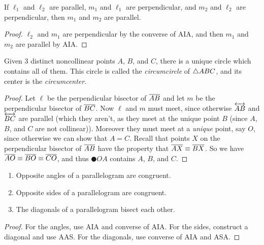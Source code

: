\begin{prop}
If \(\ell_1\) and \(\ell_2\) are parallel, \(m_1\) and \(\ell_1\) are perpendicular, and \(m_2\) and \(\ell_2\) are perpendicular, then \(m_1\) and \(m_2\) are parallel.
\end{prop}

\begin{proof}
\(\ell_2\) and \(m_1\) are perpendicular by the converse of AIA, and then \(m_1\) and \(m_2\) are parallel by AIA.
\end{proof}

\begin{construct}
Given 3 distinct noncollinear points \(A\), \(B\), and \(C\), there is a unique circle which contains all of them.
This circle is called the \emph{circumcircle} of \(\bigtriangleup{ABC}\), and its center is the \emph{circumcenter}.
\end{construct}

\begin{proof}
Let \(\ell\) be the perpendicular bisector of \(\overline{AB}\) and let \(m\) be the perpendicular bisector of \(\overline{BC}\).
Now \(\ell\) and \(m\) must meet, since otherwise \(\overleftrightarrow{AB}\) and \(\overleftrightarrow{BC}\) are parallel (which they aren't, as they meet at the unique point \(B\) (since \(A\), \(B\), and \(C\) are not collinear)).
Moreover they must meet at a \emph{unique} point, say \(O\), since otherwise we can show that \(A = C\).
Recall that points \(X\) on the perpendicular bisector of \(\overline{AB}\) have the property that \(\overline{AX} \equiv \overline{BX}\).
So we have \(\overline{AO} \equiv \overline{BO} \equiv \overline{CO}\), and thus \(\CIRCLE{O}{A}\) contains \(A\), \(B\), and \(C\).
\end{proof}

\begin{prop} \mbox{}
\begin{enumerate}
\item Opposite angles of a parallelogram are congruent.
\item Opposite sides of a parallelogram are congruent.
\item The diagonals of a parallelogram bisect each other.
\end{enumerate}
\end{prop}

\begin{proof}
For the angles, use AIA and converse of AIA.
For the sides, construct a diagonal and use AAS.
For the diagonals, use converse of AIA and ASA.
\end{proof}

